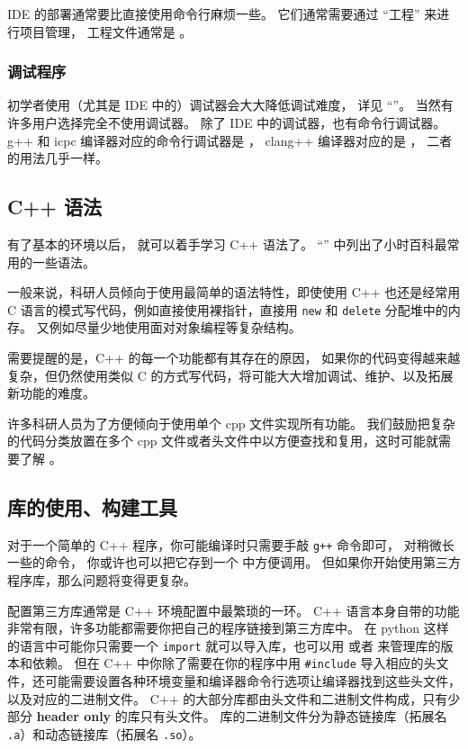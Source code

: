 IDE 的部署通常要比直接使用命令行麻烦一些。 它们通常需要通过 “工程” 来进行项目管理， 工程文件通常是 。

\subsubsection{调试程序}
初学者使用（尤其是 IDE 中的）调试器会大大降低调试难度， 详见 “”。 当然有许多用户选择完全不使用调试器。 除了 IDE 中的调试器，也有命令行调试器。 g++ 和 icpc 编译器对应的命令行调试器是 ， clang++ 编译器对应的是 ， 二者的用法几乎一样。

\subsection{C++ 语法}
有了基本的环境以后， 就可以着手学习 C++ 语法了。 “” 中列出了小时百科最常用的一些语法。

一般来说，科研人员倾向于使用最简单的语法特性，即使使用 C++ 也还是经常用 C 语言的模式写代码，例如直接使用裸指针，直接用 \verb`new` 和 \verb`delete` 分配堆中的内存。 又例如尽量少地使用面对对象编程等复杂结构。

需要提醒的是，C++ 的每一个功能都有其存在的原因， 如果你的代码变得越来越复杂，但仍然使用类似 C 的方式写代码，将可能大大增加调试、维护、以及拓展新功能的难度。

许多科研人员为了方便倾向于使用单个 cpp 文件实现所有功能。 我们鼓励把复杂的代码分类放置在多个 cpp 文件或者头文件中以方便查找和复用，这时可能就需要了解 。

\subsection{库的使用、构建工具}
对于一个简单的 C++ 程序，你可能编译时只需要手敲 \verb`g++` 命令即可， 对稍微长一些的命令， 你或许也可以把它存到一个 中方便调用。 但如果你开始使用第三方程序库，那么问题将变得更复杂。

配置第三方库通常是 C++ 环境配置中最繁琐的一环。 C++ 语言本身自带的功能非常有限，许多功能都需要你把自己的程序链接到第三方库中。 在 python 这样的语言中可能你只需要一个 \verb`import` 就可以导入库，也可以用  或者  来管理库的版本和依赖。 但在 C++ 中你除了需要在你的程序中用 \verb`#include` 导入相应的头文件，还可能需要设置各种环境变量和编译器命令行选项让编译器找到这些头文件，以及对应的二进制文件。 C++ 的大部分库都由头文件和二进制文件构成，只有少部分 \textbf{header only} 的库只有头文件。 库的二进制文件分为静态链接库（拓展名 \verb`.a`）和动态链接库（拓展名 \verb`.so`）。

